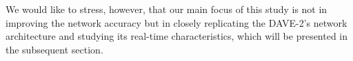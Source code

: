 We would like to stress, however, that
our main focus of this study is not in improving the network accuracy
but in closely replicating the DAVE-2's network architecture and
studying its real-time characteristics, which will be presented in the
subsequent section.
